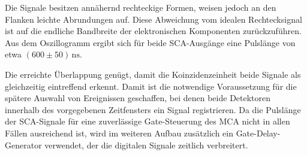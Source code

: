 Die Signale besitzen annähernd rechteckige Formen, weisen jedoch an den Flanken leichte Abrundungen auf. 
Diese Abweichung vom idealen Rechtecksignal ist auf die endliche Bandbreite der elektronischen Komponenten zurückzuführen. 
Aus dem Oszillogramm ergibt sich für beide SCA-Ausgänge eine Pulslänge von etwa $(600 \pm 50)\,\mathrm{ns}$. 

Die erreichte Überlappung genügt, damit die Koinzidenzeinheit beide Signale als gleichzeitig eintreffend erkennt. 
Damit ist die notwendige Voraussetzung für die spätere Auswahl von Ereignissen geschaffen, bei denen beide Detektoren innerhalb des vorgegebenen Zeitfensters ein Signal registrieren. 
Da die Pulslänge der SCA-Signale für eine zuverlässige Gate-Steuerung des MCA nicht in allen Fällen ausreichend ist, wird im weiteren Aufbau zusätzlich ein Gate-Delay-Generator verwendet, der die digitalen Signale zeitlich verbreitert.
